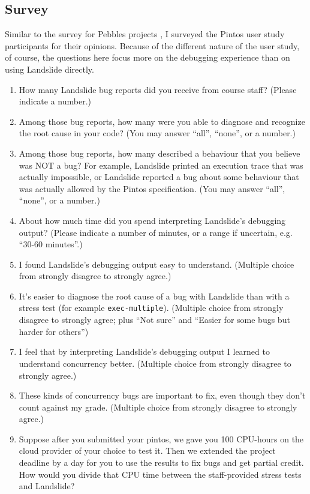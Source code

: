 \subsection{Survey}
\label{sec:education-survey-pintos}

Similar to the survey for Pebbles projects
\sect{\ref{sec:education-survey-pebbles}},
I surveyed the Pintos user study participants for their opinions.
Because of the different nature of the user study, of course,
the questions here focus more on the debugging experience than on using Landslide directly.

\begin{enumerate}
	\item How many Landslide bug reports did you receive from course staff? (Please indicate a number.)
	\item Among those bug reports, how many were you able to diagnose and recognize the root cause in your code? (You may answer ``all'', ``none'', or a number.)
	\item Among those bug reports, how many described a behaviour that you believe was NOT a bug? For example, Landslide printed an execution trace that was actually impossible, or Landslide reported a bug about some behaviour that was actually allowed by the Pintos specification. (You may answer ``all'', ``none'', or a number.)
	\item About how much time did you spend interpreting Landslide's debugging output? (Please indicate a number of minutes, or a range if uncertain, e.g. ``30-60 minutes''.)
	\item I found Landslide's debugging output easy to understand.
		(Multiple choice from strongly disagree to strongly agree.)
	\item It's easier to diagnose the root cause of a bug with Landslide than with a stress test (for example {\tt exec-multiple}).
		(Multiple choice from strongly disagree to strongly agree; plus ``Not sure'' and ``Easier for some bugs but harder for others'')
	\item I feel that by interpreting Landslide's debugging output I learned to understand concurrency better.
		(Multiple choice from strongly disagree to strongly agree.)
	\item These kinds of concurrency bugs are important to fix, even though they don't count against my grade.
		(Multiple choice from strongly disagree to strongly agree.)
	\item Suppose after you submitted your pintos, we gave you 100 CPU-hours on the cloud provider of your choice to test it. Then we extended the project deadline by a day for you to use the results to fix bugs and get partial credit. How would you divide that CPU time between the staff-provided stress tests and Landslide?

\end{enumerate}
